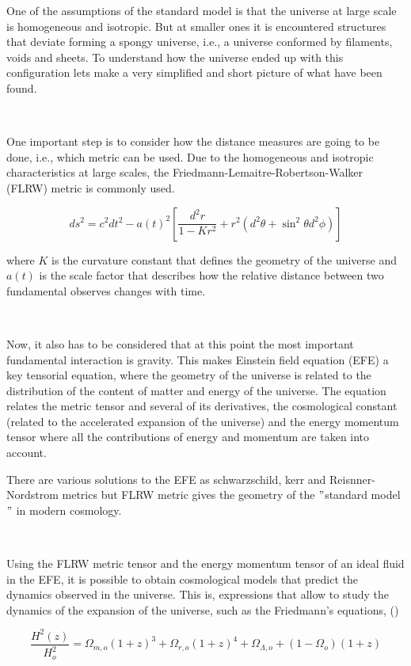 \documentclass[a4,useAMS,usegraphicx,12pt]{article}
\begin{document}
One of the assumptions of the standard model is that the universe at large scale is  homogeneous and isotropic. 
But at smaller ones it is encountered structures that 
deviate forming a spongy universe, i.e., a universe conformed by filaments, voids and sheets. To understand how the 
universe ended up with this configuration lets make a very simplified and short picture of what have been
found. 
 
 \	    
 	    
One important step is to consider how the distance measures are going to be done, i.e., which metric can be used. 
Due to the homogeneous and isotropic characteristics at large scales, the Friedmann-Lemaitre-Robertson-Walker (FLRW) 
metric is commonly used. 

\begin{equation*}
ds^2= c^2dt^2-a(t)^2\left[\frac{d^2r}{1-Kr^2} +r^2(d^2\theta
 + \sin^2\theta d^2\phi )\right]
\label{metrica}
\end{equation*} 


where $K$ is the curvature constant that defines the geometry of the universe and $a(t)$ is the scale 
factor that describes how the relative distance between two fundamental observes changes with time. 

\

Now, it also has to be considered that at this point the most important fundamental interaction is gravity. This makes
Einstein field equation (EFE) a key tensorial equation, where the geometry of the universe is related to 
the distribution of the content of matter and energy of the universe. The equation relates the metric tensor  
and several of its derivatives, the cosmological constant (related to the accelerated expansion of the universe)
and the energy momentum tensor where all the contributions of energy and momentum are taken into 
account. 

There are various solutions to the EFE as schwarzschild, kerr and Reisnner-Nordstrom metrics but FLRW
metric gives the geometry of the $"$standard model$"$ in modern cosmology.  

\

Using the FLRW metric tensor and the energy momentum tensor of an ideal fluid in the EFE, it is possible
to obtain cosmological models that predict the dynamics observed in the universe. This is, expressions that 
allow to study the dynamics of the expansion of the universe, such as the Friedmann's equations, 
(\cite{Longair})

\begin{equation*}
\frac{H^2(z)}{H_o^{2}}=\Omega_{m,o}\left(1+z\right)^3+
\Omega_{r,o}\left(1+z\right)^4+ \Omega_{\Lambda,o} + ( 1-\Omega_o)
\left(1+z\right)
\label{fried2}
\end{equation*}
\end{document}
